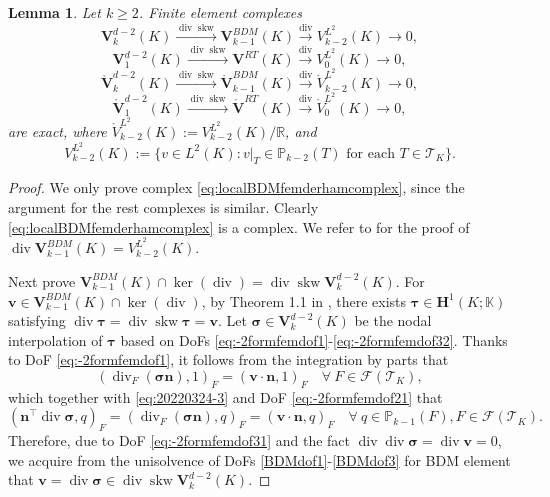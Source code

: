 \documentclass[10pt]{amsart}
\newtheorem{lemma}[theorem]{Lemma}
\renewcommand{\div}{\operatorname{div}}
\newcommand{\skw}{\operatorname{skw}}
\numberwithin{equation}{section}
\begin{document}
\begin{lemma}
Let $k\geq2$. Finite element complexes
\begin{equation}\label{eq:localBDMfemderhamcomplex}
\boldsymbol{V}_{k}^{d-2}(K)\xrightarrow{\div\skw}\boldsymbol{V}_{k-1}^{BDM}(K)\xrightarrow{\div} V_{k-2}^{L^2}(K)\to0,    
\end{equation}
\begin{equation}\label{eq:localRTfemderhamcomplex}
\boldsymbol{V}_{1}^{d-2}(K)\xrightarrow{\div\skw}\boldsymbol{V}^{RT}(K)\xrightarrow{\div} V_{0}^{L^2}(K)\to0,    
\end{equation}
\begin{equation}\label{eq:localBDMfemderhamcomplex0}
\mathring{\boldsymbol{V}}_{k}^{d-2}(K)\xrightarrow{\div\skw}\mathring{\boldsymbol{V}}_{k-1}^{BDM}(K)\xrightarrow{\div} \mathring{V}_{k-2}^{L^2}(K)\to0,    
\end{equation}
\begin{equation}\label{eq:localRTfemderhamcomplex0}
\mathring{\boldsymbol{V}}_{1}^{d-2}(K)\xrightarrow{\div\skw}\mathring{\boldsymbol{V}}^{RT}(K)\xrightarrow{\div} \mathring{V}_{0}^{L^2}(K)\to0,    
\end{equation}
are exact, where $\mathring{V}_{k-2}^{L^2}(K):=V_{k-2}^{L^2}(K)/\mathbb R$, and
$$
V_{k-2}^{L^2}(K):=\{v\in L^2(K): v|_{T}\in \mathbb P_{k-2}(T) \textrm{ for each } T\in\mathcal T_K\}.
$$
\end{lemma}
\begin{proof}
We only prove complex \eqref{eq:localBDMfemderhamcomplex}, since the argument for the rest complexes is similar. Clearly \eqref{eq:localBDMfemderhamcomplex} is a complex. We refer to \cite[Section 4]{ChenHuang2021divX} for the proof of $\div\boldsymbol{V}_{k-1}^{BDM}(K)=V_{k-2}^{L^2}(K)$.

Next prove $\boldsymbol{V}_{k-1}^{BDM}(K)\cap\ker(\div)=\div\skw\boldsymbol{V}_{k}^{d-2}(K)$. For $\boldsymbol{v}\in\boldsymbol{V}_{k-1}^{BDM}(K)\cap\ker(\div)$, by Theorem 1.1 in \cite{CostabelMcIntosh2010}, there exists $\boldsymbol{\tau}\in\boldsymbol{H}^1(K;\mathbb K)$ satisfying $\div\boldsymbol{\tau}=\div\skw\boldsymbol{\tau}=\boldsymbol{v}$. Let $\boldsymbol{\sigma}\in \boldsymbol{V}_{k}^{d-2}(K)$ be the nodal interpolation of $\boldsymbol{\tau}$ based on DoFs \eqref{eq:-2formfemdof1}-\eqref{eq:-2formfemdof32}. Thanks to DoF \eqref{eq:-2formfemdof1}, it follows from the integration by parts that
$$
(\div_F(\boldsymbol{\sigma}\boldsymbol{n}), 1)_F=(\boldsymbol{v}\cdot\boldsymbol{n}, 1)_F\quad\forall~F\in\mathcal F(\mathcal T_K),
$$
which together with \eqref{eq:20220324-3} and DoF \eqref{eq:-2formfemdof21} that
$$
(\boldsymbol{n}^{\intercal}\div\boldsymbol{\sigma}, q)_F = (\div_F(\boldsymbol{\sigma}\boldsymbol{n}), q)_F=(\boldsymbol{v}\cdot\boldsymbol{n}, q)_F\quad\forall~q\in \mathbb P_{k-1}(F),F\in\mathcal F(\mathcal T_K).
$$
Therefore, due to DoF \eqref{eq:-2formfemdof31} and the fact $\div\div\boldsymbol{\sigma}=\div\boldsymbol{v}=0$,
we acquire from the unisolvence of DoFs \eqref{BDMdof1}-\eqref{BDMdof3} for BDM element that $\boldsymbol{v}=\div\boldsymbol{\sigma} \in \div\skw\boldsymbol{V}_{k}^{d-2}(K)$.
\end{proof}
\end{document}
